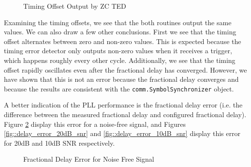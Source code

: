 \documentclass{article}
\begin{document}
\begin{figure}[H]
	\centerline{}
	\caption{Timing Offset Output by ZC TED}
	\label{fig::timing_offset}
\end{figure}

\noindent Examining the timing offsets, we see that the both routines output the same values. We can also draw a few other conclusions. First we see that the timing offset alternates between zero and non-zero values. This is expected because the timing error detector only outputs non-zero values when it receives a trigger, which happens roughly every other cycle. Additionally, we see that the timing offset rapidly oscillates even after the fractional delay has converged. However, we have shown that this is not an error because the fractional delay converges and because the results are consistent with the \texttt{comm.SymbolSynchronizer} object.

A better indication of the PLL performance is the fractional delay error (i.e. the difference between the measured fractional delay and configured fractional delay). Figure \ref{fig::delay_error_no_noise} display this error for a noise-free signal, and Figures \ref{fig::delay_error_20dB_snr} and \ref{fig::delay_error_10dB_snr} display this error for 20dB and 10dB SNR respectively. 

\begin{figure}[H]
	\centerline{}
	\caption{Fractional Delay Error for Noise Free Signal}
	\label{fig::delay_error_no_noise}
\end{figure}
\end{document}
